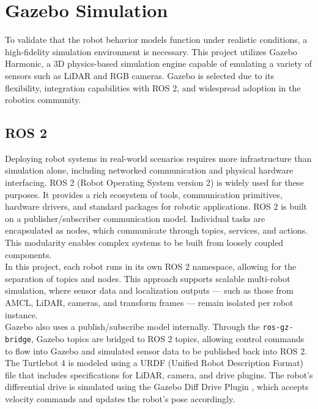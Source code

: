 \section{Gazebo Simulation}
To validate that the robot behavior models function under realistic conditions, a high-fidelity simulation environment is necessary. This project utilizes Gazebo Harmonic, a 3D physics-based simulation engine capable of emulating a variety of sensors such as LiDAR and RGB cameras. Gazebo is selected due to its flexibility, integration capabilities with ROS 2, and widespread adoption in the robotics community.

\subsection{ROS 2}
\label{sub:ros_2}
Deploying robot systems in real-world scenarios requires more infrastructure than simulation alone, including networked communication and physical hardware interfacing. ROS 2 (Robot Operating System version 2) is widely used for these purposes. It provides a rich ecosystem of tools, communication primitives, hardware drivers, and standard packages for robotic applications. ROS 2 is built on a publisher/subscriber communication model. Individual tasks are encapsulated as nodes, which communicate through topics, services, and actions. This modularity enables complex systems to be built from loosely coupled components. \\

In this project, each robot runs in its own ROS 2 namespace, allowing for the separation of topics and nodes. This approach supports scalable multi-robot simulation, where sensor data and localization outputs --- such as those from AMCL, LiDAR, cameras, and transform frames --- remain isolated per robot instance.\\

Gazebo also uses a publish/subscribe model internally. Through the \texttt{ros-gz-bridge}, Gazebo topics are bridged to ROS 2 topics, allowing control commands to flow into Gazebo and simulated sensor data to be published back into ROS 2.\\

The Turtlebot 4 is modeled using a URDF (Unified Robot Description Format) file that includes specifications for LiDAR, camera, and drive plugins. The robot’s differential drive is simulated using the Gazebo Diff Drive Plugin \cite{gz-diff-drive}, which accepts velocity commands and updates the robot's pose accordingly.

